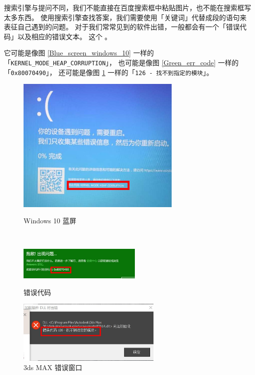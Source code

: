 搜索引擎与提问不同，我们不能直接在百度搜索框中粘贴图片，也不能在搜索框写太多东西。
使用搜索引擎查找答案，我们需要使用「关键词」代替成段的语句来表征自己遇到的问题。
对于我们常常见到的软件出错，一般都会有一个「错误代码」以及相应的错误文本。
这个 。

它可能是像图 \ref{Blue_screen_windows_10} 一样的「\verb|KERNEL_MODE_HEAP_CORRUPTION|」，
也可能是像图 \ref{Green_err_code} 一样的「\verb|0x80070490|」，
还可能是像图 \ref{3Ds_Max_err_code} 一样的「\verb|126 - 找不到指定的模块|」。

\begin{figure}[htb!]
  \centering
  \begin{minipage}{10cm}
    \centering
    \includegraphics[width=8cm]{assets/Blue_screen_windows_10.jpg}
    \caption{Windows 10 蓝屏}
    \label{Blue_screen_windows_10}
  \end{minipage}
  \\\vspace*{1ex}
  \begin{minipage}{6.2cm}
    \centering
    \includegraphics[width=6cm]{assets/Green_err_code.jpg}
    \caption{错误代码}
    \label{Green_err_code}
  \end{minipage}
  \quad
  \begin{minipage}{7.2cm}
    \centering
    \includegraphics[width=7cm]{assets/3Ds_Max_err_code.jpg}
    \caption{3ds MAX 错误窗口}
    \label{3Ds_Max_err_code}
  \end{minipage}
\end{figure}


